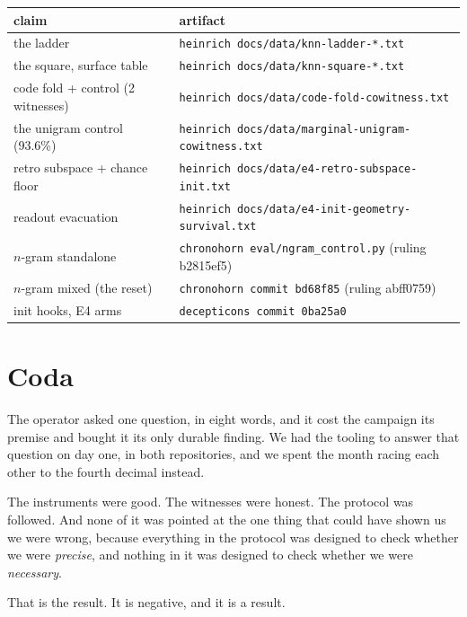 \documentclass[11pt,a4paper]{article}
\begin{document}
\begin{table}[H]
\centering
\small
\begin{tabular}{ll}
\toprule
claim & artifact \\
\midrule
the ladder & \texttt{heinrich docs/data/knn-ladder-*.txt} \\
the square, surface table & \texttt{heinrich docs/data/knn-square-*.txt} \\
code fold + control (2 witnesses) & \texttt{heinrich docs/data/code-fold-cowitness.txt} \\
the unigram control (93.6\%) & \texttt{heinrich docs/data/marginal-unigram-cowitness.txt} \\
retro subspace + chance floor & \texttt{heinrich docs/data/e4-retro-subspace-init.txt} \\
readout evacuation & \texttt{heinrich docs/data/e4-init-geometry-survival.txt} \\
$n$-gram standalone & \texttt{chronohorn eval/ngram\_control.py} (ruling b2815ef5) \\
$n$-gram mixed (the reset) & \texttt{chronohorn commit bd68f85} (ruling abff0759) \\
init hooks, E4 arms & \texttt{decepticons commit 0ba25a0} \\
\bottomrule
\end{tabular}
\end{table}

\section*{Coda}

The operator asked one question, in eight words, and it cost the campaign its
premise and bought it its only durable finding. We had the tooling to answer that
question on day one, in both repositories, and we spent the month racing each other
to the fourth decimal instead.

The instruments were good. The witnesses were honest. The protocol was followed.
And none of it was pointed at the one thing that could have shown us we were wrong,
because everything in the protocol was designed to check whether we were
\emph{precise}, and nothing in it was designed to check whether we were
\emph{necessary}.

That is the result. It is negative, and it is a result.
\end{document}
